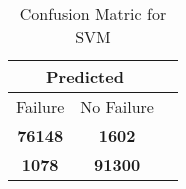 \begin{table}[] 
\caption{Confusion Matric for SVM} 
\label{Table: Prediction Accuracy-NoneSVMOnlySunEKF-ignoreReflection100.9EKF-top2-Reflection} 
\centering 
\begin{tabular} 
 {@{}ccc@{}} 
\toprule 
\multicolumn{2}{c}{\textbf{Predicted}}
 \\ \midrule 
\multicolumn{1}{|c|}{Failure} & 
\multicolumn{1}{c|}{No Failure}
 \\ \midrule 
\multicolumn{1}{|c|}{\color{green}\textbf{76148}} & 
\multicolumn{1}{c|}{\color{red}\textbf{1602}}
 \\ \midrule 
\multicolumn{1}{|c|}{\color{red}\textbf{1078}} & 
\multicolumn{1}{c|}{\color{green}\textbf{91300}}
 \\ \bottomrule 
\end{tabular} 
\end{table} 
